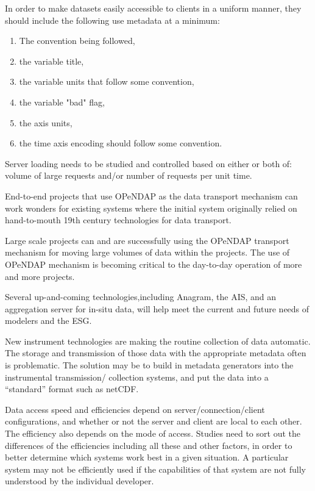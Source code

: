 In order to make datasets easily accessible to clients in a uniform
manner, they should include the following use metadata at a minimum:

\begin{enumerate}
   \item The convention being followed,
   \item the variable title,
   \item the variable units that follow some convention,
   \item the variable "bad" flag,
   \item the axis units,
   \item the time axis encoding should follow some convention.
\end{enumerate}

Server loading needs to be studied and controlled based on either
or both of:  volume of large requests and/or number of requests
per unit time.

End-to-end projects that use OPeNDAP as the data transport mechanism
can work wonders for existing systems where the initial system originally
relied on hand-to-mouth 19th century technologies for data transport.

Large scale projects can and are successfully using the OPeNDAP
transport mechanism for moving large volumes of data within
the projects.  The use of OPeNDAP mechanism is becoming critical
to the day-to-day operation of more and more projects.

Several up-and-coming technologies,including Anagram, the \ac{AIS},
and an aggregation server for in-situ data, will help meet the
current and future needs of modelers and the \ac{ESG}.  

New instrument technologies are making the routine collection of
data automatic.  The storage and transmission of those data with
the appropriate metadata often is problematic.  The solution may
be to build in metadata generators into the instrumental transmission/
collection systems, and put the data into a ``standard'' format such
as netCDF.

Data access speed and efficiencies depend on server/connection/client
configurations, and whether or not the server and client are local
to each other.  The efficiency also depends on the mode of access.
Studies need to sort out the differences of the efficiencies including
all these and other factors, in order to better determine which
systems work best in a given situation.  A particular system may not
be efficiently used if the capabilities of that system are not fully
understood by the individual developer.

%
%
%
%

